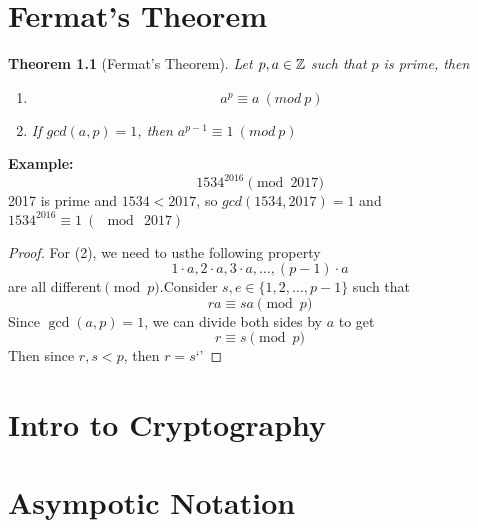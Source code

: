\documentclass[openany]{report}
\newtheorem{theorem}{Theorem}[section]
\begin{document}
\chapter{Fermat's Theorem}
\begin{theorem}[Fermat's Theorem]
    Let $p,a \in \mathbb{Z}$ such that $p$ is prime, then 
    \begin{enumerate}
        \item
    $$a^p \equiv a \ (mod \ p)$$
        \item
    If $gcd(a,p) = 1$, then $a^{p-1} \equiv 1 \ (mod \ p)$
        
    \end{enumerate}
\end{theorem}
\noindent
\textbf{Example:} 
$$1534^{2016} \pmod{2017}$$
2017 is prime and $1534 < 2017$, so $gcd(1534, 2017) = 1$ and $1534^{2016} \equiv 1 \ (\mod \ 2017)$
\begin{proof}For (2), we need to usthe following property
\[1 \cdot a, 2\cdot a, 3 \cdot a, \dots, (p-1)\cdot a\] 
are all different$\pmod{p}$.Consider $s, e \in \{1, 2, \ldots, p-1\}$ such that 
\[ra \equiv sa \pmod{p}\]
Since $\gcd(a,p) = 1$, we can divide both sides by $a$ to get 
\[r \equiv s \pmod{p}\]
Then since $r, s < p$, then $r = s$`'

\end{proof}

\setcounter{chapter}{11}

\chapter{Intro to Cryptography}

\chapter{Asympotic Notation}
\end{document}
